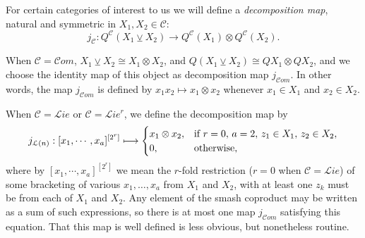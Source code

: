 \documentclass[11pt]{amsart} \renewcommand{\baselinestretch}{1.2}
\theoremstyle{plain}
\theoremstyle{definition}
\renewcommand{\to}{\longrightarrow}
\newcommand{\scrL}{\mathscr{L}}
\newcommand{\scrC}{\mathscr{C}}
\newcommand{\calL}{\mathcal{L}}
\newcommand{\calc}{\mathcal{C}}
\newcommand{\restnRepeated}[2]{#1^{[2^{#2}]}}
\newcommand{\crossterms}{\mathrm{cr}}
\newcommand{\algs}{{\scrC\!\textit{om}}}
\newcommand{\liealgs}{{\scrL\!\textit{ie}}}
\newcommand{\restliealgs}{{\scrL\!\textit{ie}^\textit{r}}}
\newcommand{\smashcoprod}{\veebar}%
\renewcommand{\mapsto}{\longmapsto}
\begin{document}
\begin{Pi-algebras and cohomology algebras}
%

For certain categories of interest to us we will define a \emph{decomposition map}, natural and symmetric in $X_1,X_2\in\calc$:
\[j_\calc:Q^\calc(X_1\smashcoprod X_2)\to Q^\calc(X_1)\otimes Q^\calc(X_2).\]

When $\calc=\algs$, $X_1\smashcoprod X_2\cong X_1\otimes X_2$, and $Q(X_1\smashcoprod X_2)\cong QX_1\otimes QX_2$, and we choose the identity map of this object as decomposition map $j_\algs$. In other words, the map $j_{\algs}$ is defined by $x_1x_2\mapsto x_1\otimes x_2$ whenever $x_1\in X_1$ and $x_2\in X_2$.

When $\calc=\liealgs$ or $\calc=\restliealgs$, we define the decomposition map by 
\[j_{\calL(n)}:\restnRepeated{[x_1,\cdots ,x_a]}{r}\longmapsto\begin{cases}
x_1\otimes x_2,&\textup{if }r=0,\,a=2,\,z_1\in X_1,\,z_2\in X_2,
\\0,&\textup{otherwise,}
\end{cases}\]
where by $\restnRepeated{[x_1,\cdots ,x_a]}{r}$ we mean the $r$-fold restriction ($r=0$ when $\calc=\liealgs$) of some bracketing of various $x_1,\ldots,x_a$ from $X_1$ and $X_2$, with at least one $z_k$ must be from each of $X_1$ and $X_2$.  Any element of the smash coproduct may be written as a sum of such expressions, so there is at most one map $j_\algs$ satisfying this equation. That this map is well defined is less obvious, but nonetheless routine.



\end{Pi-algebras and cohomology algebras}
\end{document}

